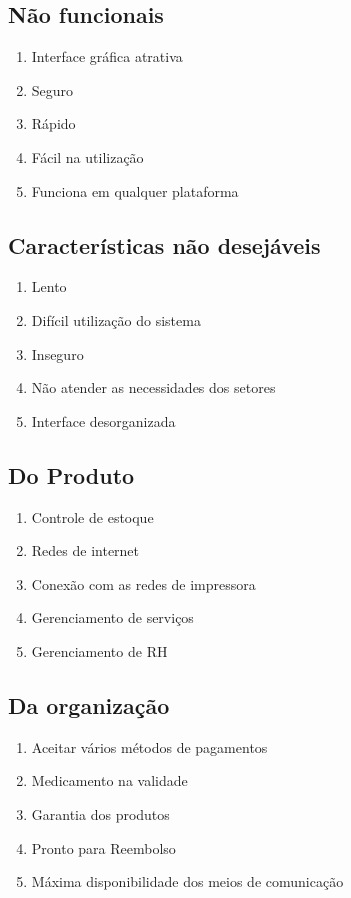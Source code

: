 \subsection{Não funcionais}
\begin{enumerate}
  \item Interface gráfica atrativa
  \item Seguro
  \item Rápido
  \item Fácil na utilização
  \item Funciona em qualquer plataforma
\end{enumerate}


\subsection{Características não desejáveis}

\begin{enumerate}
  \item Lento
  \item Difícil utilização do sistema
  \item Inseguro
  \item Não atender as necessidades dos setores
  \item Interface desorganizada
\end{enumerate}



\subsection{Do Produto}

\begin{enumerate}
  \item Controle de estoque
  \item Redes de internet
  \item Conexão com as redes de impressora
  \item Gerenciamento de serviços
  \item Gerenciamento de RH
\end{enumerate}

\subsection{Da organização}

\begin{enumerate}
  \item Aceitar vários métodos de pagamentos
  \item Medicamento na validade
  \item Garantia dos produtos
  \item Pronto para Reembolso 
  \item Máxima disponibilidade dos meios de comunicação
\end{enumerate}
  


